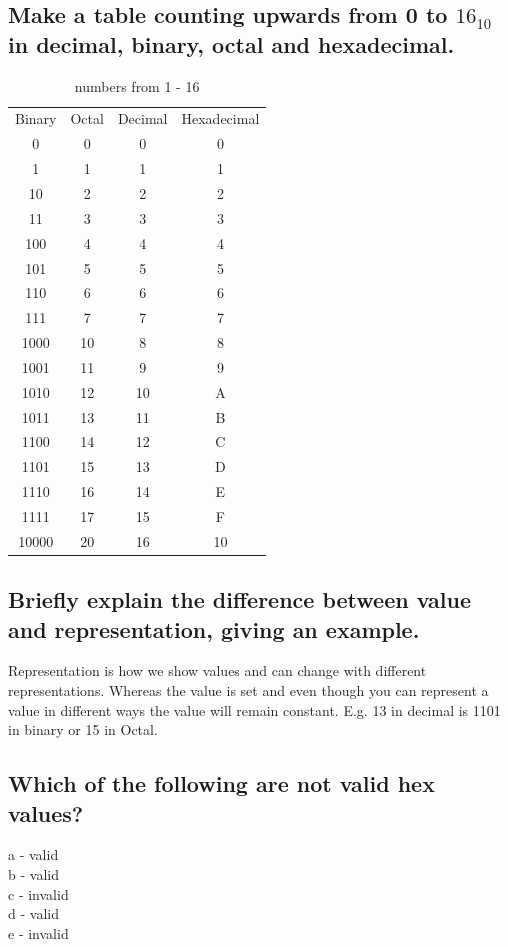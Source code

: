 \documentclass{article}
\begin{document}
\subsection{Make a table counting upwards from 0 to $16_{10}$ in decimal, binary, octal and hexadecimal.}
\begin{table}[h]
    \centering
    \begin{tabular}{|c|c|c|c|}
        Binary & Octal & Decimal & Hexadecimal \\
        0 & 0 & 0 & 0 \\
        1 & 1 & 1 & 1 \\
        10 & 2 & 2 & 2 \\
        11 & 3 & 3 & 3 \\
        100 & 4 & 4 & 4 \\
        101 & 5 & 5 & 5 \\
        110 & 6 & 6 & 6 \\
        111 & 7 & 7 & 7 \\
        1000 & 10 & 8 & 8 \\
        1001 & 11 & 9 & 9 \\
        1010 & 12 & 10 & A \\
        1011 & 13 & 11 & B \\
        1100 & 14 & 12 & C \\
        1101 & 15 & 13 & D \\
        1110 & 16 & 14 & E \\
        1111 & 17 & 15 & F \\
        10000 & 20 & 16 & 10
    \end{tabular}
    \caption{numbers from 1 - 16}
    \label{tab:my_label}
\end{table}

\subsection{Briefly explain the difference between value and representation, giving an example.}
Representation is how we show values and can change with different representations. Whereas the value is set and even though you can represent a value in different ways the value will remain constant. E.g. 13 in decimal is 1101 in binary or 15 in Octal.

\subsection{Which of the following are not valid hex values?}
a - valid\\
b - valid\\
c - invalid\\
d - valid\\
e - invalid
\end{document}
